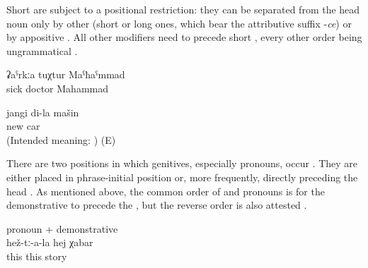 Short  are subject to a positional restriction: they can be separated from the head noun only by other  (short or long ones, which bear the attributive suffix -\textit{ce})  or by appositive  . All other modifiers need to precede short  , every other order being ungrammatical .
%
\begin{exe}
	\ex	\label{ex:the sick doctor Mahammad}
	\gll	ʡaˁrkːa	tuχtur	Maˁħaˁmmad\\
		sick doctor	Mahammad\\
	\glt	{}

	\ex	\label{ex:my new car ungrammatical}
	\gll	* jangi di-la mašin\\
		{} new		car\\
	\glt	(Intended meaning: ) (E)
\end{exe}


There are two positions in which genitives, especially  pronouns, occur . They are either placed in phrase-initial position  or, more frequently, directly preceding the head . As mentioned above, the common order of  and  pronouns is for the demonstrative to precede the  , but the reverse order is also attested .
%
\begin{exe}
		\ex	{} pronoun + demonstrative\\	\label{ex:their this story@11a}
		\gll	hež-tː-a-la	hej	χabar\\
			this	this	story\\
		\glt	{}
\end{exe}

